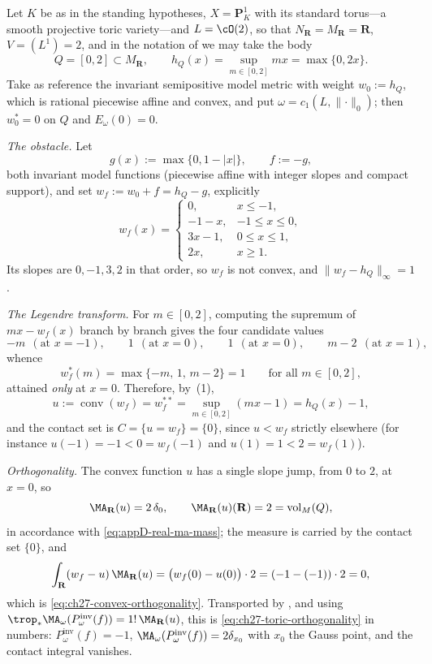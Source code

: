 \begin{example}
\label{ex:ch27-toric-legendre}
Let $K$ be as in the standing hypotheses, $X=\mathbf P^1_K$
with its standard torus---a smooth projective toric variety---and
$L=\cO(2)$, so that
$N_{\mathbf R}=M_{\mathbf R}=\mathbf R$, $V=(L^1)=2$, and in the
notation of  we may take the body
\[
 Q=[0,2]\subset M_{\mathbf R},
 \qquad
 h_Q(x)=\sup_{m\in[0,2]}mx=\max\{0,2x\} .
\]
Take as reference the invariant semipositive model metric with weight
$w_0:=h_Q$, which is rational piecewise affine and convex, and put
$\omega=c_1(L,\lVert\cdot\rVert_0)$; then
$w_0^*=0$ on $Q$ and $E_\omega(0)=0$.

\emph{The obstacle.}  Let
\[
 g(x):=\max\{0,1-|x|\},
 \qquad
 f:=-g,
\]
both invariant model functions (piecewise affine with integer slopes and
compact support), and set $w_f:=w_0+f=h_Q-g$, explicitly
\[
 w_f(x)=
 \begin{cases}
  0,&x\leq-1,\\
  -1-x,&-1\leq x\leq0,\\
  3x-1,&0\leq x\leq1,\\
  2x,&x\geq1 .
 \end{cases}
\]
Its slopes are $0,-1,3,2$ in that order, so $w_f$ is not convex, and
$\lVert w_f-h_Q\rVert_\infty=1$.

\emph{The Legendre transform.}  For $m\in[0,2]$, computing the supremum of
$mx-w_f(x)$ branch by branch gives the four candidate values
\[
 -m\ \ (\text{at }x=-1),
 \qquad 1\ \ (\text{at }x=0),
 \qquad 1\ \ (\text{at }x=0),
 \qquad m-2\ \ (\text{at }x=1),
\]
whence
\[
 w_f^*(m)=\max\{-m,\,1,\,m-2\}=1
 \qquad\text{for all }m\in[0,2],
\]
attained \emph{only} at $x=0$.  Therefore, by
\,(1),
\[
 u:=\operatorname{conv}(w_f)=w_f^{**}
   =\sup_{m\in[0,2]}(mx-1)=h_Q(x)-1,
\]
and the contact set is
$C=\{u=w_f\}=\{0\}$, since $u<w_f$ strictly elsewhere (for instance
$u(-1)=-1<0=w_f(-1)$ and $u(1)=1<2=w_f(1)$).

\emph{Orthogonality.}  The convex function $u$ has a single slope jump,
from $0$ to $2$, at $x=0$, so
\[
 \MA_{\mathbf R}(u)=2\,\delta_0,
 \qquad
 \MA_{\mathbf R}(u)(\mathbf R)=2=\operatorname{vol}_M(Q),
\]
in accordance with \eqref{eq:appD-real-ma-mass}; the measure is carried by
the contact set $\{0\}$, and
\[
 \int_{\mathbf R}(w_f-u)\,\MA_{\mathbf R}(u)
 =\bigl(w_f(0)-u(0)\bigr)\cdot2=(-1-(-1))\cdot2=0,
\]
which is \eqref{eq:ch27-convex-orthogonality}.  Transported by
, and using
$\trop_*\MA_\omega(P^{\mathrm{inv}}_\omega(f))=1!\,\MA_{\mathbf R}(u)$, this
is \eqref{eq:ch27-toric-orthogonality} in numbers:
$P^{\mathrm{inv}}_\omega(f)=-1$, $\MA_\omega(P^{\mathrm{inv}}_\omega(f))=
2\delta_{x_0}$ with $x_0$ the Gauss point, and the contact integral
vanishes.


\end{example}
